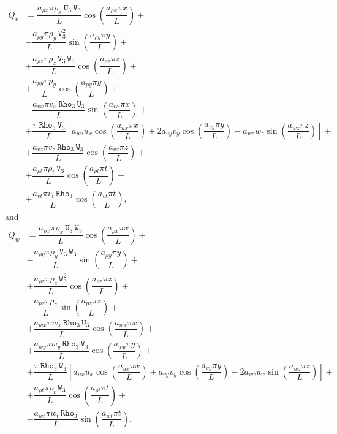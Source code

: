 \documentclass[10pt]{article}
\newcommand{\Rho}{\,\mathtt{Rho}}
\newcommand{\U}{\,\mathtt{U}}
\newcommand{\V}{\,\mathtt{V}}
\newcommand{\W}{\,\mathtt{W}}
\begin{document}
\begin{equation}
 \begin{split}
Q_v &= \dfrac{a_{\rho x} \pi \rho_x \U_3 \V_3 }{L}\cos\left(\dfrac{a_{\rho x} \pi x}{L}\right)+\\
&-\dfrac{a_{\rho y} \pi \rho_y \V_3^2 }{L}\sin\left(\dfrac{a_{\rho y} \pi y}{L}\right)+\\
&+\dfrac{a_{\rho z} \pi \rho_z \V_3 \W_3 }{L}\cos\left(\dfrac{a_{\rho z}\pi z }{L}\right)+\\
&+\dfrac{a_{py} \pi p_y }{L}\cos\left(\dfrac{a_{py} \pi y}{L}\right)+\\
&-\dfrac{a_{vx} \pi v_x \Rho_3 \U_3 }{L}\sin\left(\dfrac{a_{vx} \pi x}{L}\right)+\\
&+\dfrac{\pi \Rho_3 \V_3}{L}\left[a_{ux} u_x \cos\left(\dfrac{a_{ux} \pi x}{L}\right)+2 a_{vy} v_y \cos\left(\dfrac{a_{vy} \pi y}{L}\right)-a_{wz} w_z \sin\left(\dfrac{a_{wz}\pi z }{L}\right)\right]+\\
&+\dfrac{a_{vz} \pi v_z \Rho_3 \W_3 }{L}\cos\left(\dfrac{a_{vz}\pi z }{L}\right) +\\
&+  \dfrac{ a_{\rho t} \pi\rho_t \V_3 }{L}\cos\left(\dfrac{a_{\rho t} \pi  t}{L}\right)+\\
&+\dfrac{a_{vt} \pi v_t \Rho_3 }{L}\cos\left(\dfrac{a_{vt} \pi t}{L}\right),
 \end{split}
\end{equation}
and
\begin{equation}
 \begin{split}
Q_w &= \dfrac{a_{\rho x} \pi \rho_x \U_3 \W_3}{L} \cos\left(\dfrac{a_{\rho x} \pi x}{L}\right)+\\
&-\dfrac{a_{\rho y} \pi \rho_y \V_3 \W_3 }{L}\sin\left(\dfrac{a_{\rho y} \pi y}{L}\right)+\\
&+\dfrac{a_{\rho z} \pi \rho_z \W_3^2 }{L}\cos\left(\dfrac{a_{\rho z}\pi z }{L}\right)+\\
&-\dfrac{a_{pz} \pi p_z }{L}\sin\left(\dfrac{a_{pz}\pi z }{L}\right)+\\
&+\dfrac{a_{wx} \pi w_x \Rho_3 \U_3 }{L}\cos\left(\dfrac{a_{wx} \pi x}{L}\right)+\\
&+\dfrac{a_{wy} \pi w_y \Rho_3 \V_3}{L}\cos\left(\dfrac{a_{wy} \pi y}{L}\right) +\\
&+\dfrac{\pi \Rho_3 \W_3}{L}\left[a_{ux} u_x \cos\left(\dfrac{a_{ux} \pi x}{L}\right)+a_{vy} v_y \cos\left(\dfrac{a_{vy} \pi y}{L}\right)-2 a_{wz} w_z \sin\left(\dfrac{a_{wz}\pi z }{L}\right)\right]+\\
&+ \dfrac{a_{\rho t} \pi \rho_t \W_3 }{L}\cos\left(\dfrac{a_{\rho t} \pi  t}{L}\right)+\\
 &-\dfrac{a_{wt} \pi w_t \Rho_3 }{L}\sin\left(\dfrac{a_{wt} \pi  t}{L}\right).
 \end{split}
\end{equation}
\end{document}

